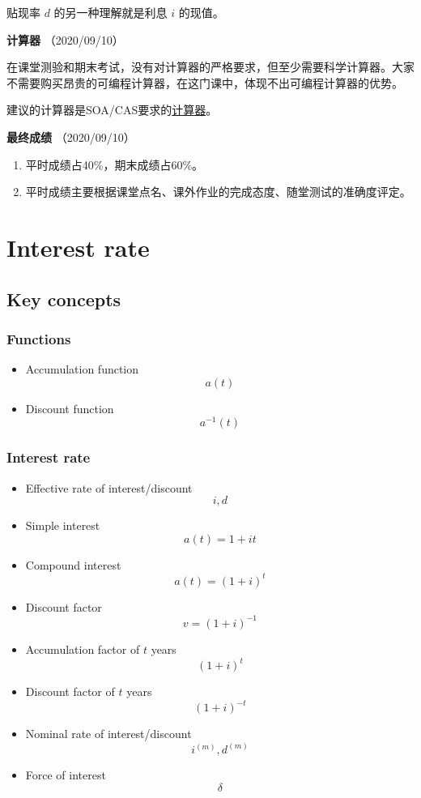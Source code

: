 \documentclass[
]{book}
\begin{document}
贴现率 \(d\) 的另一种理解就是利息 \(i\) 的现值。

\textbf{计算器} （2020/09/10）

在课堂测验和期末考试，没有对计算器的严格要求，但至少需要科学计算器。大家不需要购买昂贵的可编程计算器，在这门课中，体现不出可编程计算器的优势。

建议的计算器是SOA/CAS要求的\href{https://www.soa.org/education/exam-req/exam-day-info/edu-id-calculators/}{计算器}。

\textbf{最终成绩} （2020/09/10）

\begin{enumerate}
\def\labelenumi{\arabic{enumi}.}
\item
  平时成绩占40\%，期末成绩占60\%。
\item
  平时成绩主要根据课堂点名、课外作业的完成态度、随堂测试的准确度评定。
\end{enumerate}

\hypertarget{interest-rate}{%
\chapter{Interest rate}\label{interest-rate}}

\hypertarget{key-concepts}{%
\section{Key concepts}\label{key-concepts}}

\hypertarget{functions}{%
\subsection*{Functions}\label{functions}}

\begin{itemize}
\item
  Accumulation function \[a(t)\]
\item
  Discount function \[a^{-1}(t)\]
\end{itemize}

\hypertarget{interest-rate-1}{%
\subsection*{Interest rate}\label{interest-rate-1}}

\begin{itemize}
\item
  Effective rate of interest/discount \[i,d\]
\item
  Simple interest \[a(t)=1+it\]
\item
  Compound interest \[a(t)=(1+i)^t\]
\item
  Discount factor \[v=(1+i)^{-1}\]
\item
  Accumulation factor of \(t\) years \[(1+i)^t\]
\item
  Discount factor of \(t\) years \[(1+i)^{-t}\]
\item
  Nominal rate of interest/discount \[i^{(m)},d^{(m)}\]
\item
  Force of interest \[\delta\]
\end{itemize}
\end{document}
